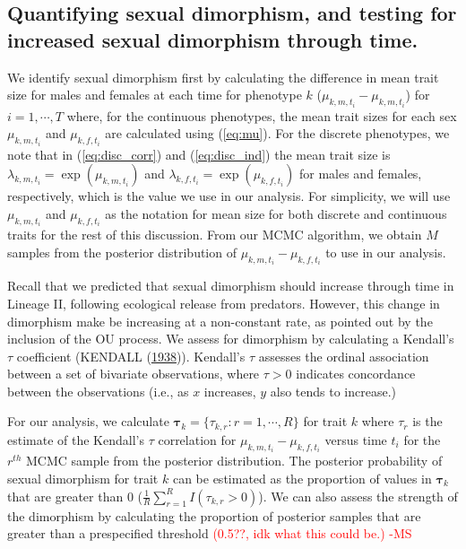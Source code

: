 \documentclass[
  12pt,
]{article}
\begin{document}
\hypertarget{quantifying-sexual-dimorphism-and-testing-for-increased-sexual-dimorphism-through-time.}{%
\subsection{Quantifying sexual dimorphism, and testing for increased
sexual dimorphism through
time.}\label{quantifying-sexual-dimorphism-and-testing-for-increased-sexual-dimorphism-through-time.}}

We identify sexual dimorphism first by calculating the difference in
mean trait size for males and females at each time for phenotype \(k\)
(\(\mu_{k,m,t_i} - \mu_{k,m,t_i}\)) for \(i = 1,\cdots,T\) where, for
the continuous phenotypes, the mean trait sizes for each sex
\(\mu_{k,m,t_i}\) and \(\mu_{k,f,t_i}\) are calculated using
(\ref{eq:mu}). For the discrete phenotypes, we note that in
(\ref{eq:disc_corr}) and (\ref{eq:disc_ind}) the mean trait size is
\(\lambda_{k,m,t_i} = \exp(\mu_{k,m,t_i})\) and
\(\lambda_{k,f,t_i} = \exp(\mu_{k,f,t_i})\) for males and females,
respectively, which is the value we use in our analysis. For simplicity,
we will use \(\mu_{k,m,t_i}\) and \(\mu_{k,f,t_i}\) as the notation for
mean size for both discrete and continuous traits for the rest of this
discussion. From our MCMC algorithm, we obtain \(M\) samples from the
posterior distribution of \(\mu_{k,m,t_i} - \mu_{k,f,t_i}\) to use in
our analysis.

Recall that we predicted that sexual dimorphism should increase through
time in Lineage II, following ecological release from predators.
However, this change in dimorphism make be increasing at a non-constant
rate, as pointed out by the inclusion of the OU process. We assess for
dimorphism by calculating a Kendall's \(\tau\) coefficient (KENDALL
(\protect\hyperlink{ref-KendallsTau}{1938})). Kendall's \(\tau\)
assesses the ordinal association between a set of bivariate
observations, where \(\tau > 0\) indicates concordance between the
observations (i.e., as \(x\) increases, \(y\) also tends to increase.)

For our analysis, we calculate
\(\boldsymbol{\tau}_k = \{\tau_{k,r}: r = 1,\cdots,R\}\) for trait \(k\)
where \(\tau_r\) is the estimate of the Kendall's \(\tau\) correlation
for \(\mu_{k,m,t_i} - \mu_{k,f,t_i}\) versus time \(t_i\) for the
\(r^{th}\) MCMC sample from the posterior distribution. The posterior
probability of sexual dimorphism for trait \(k\) can be estimated as the
proportion of values in \(\boldsymbol{\tau}_k\) that are greater than 0
(\(\frac{1}{R} \sum_{r=1}^R I(\tau_{k,r} > 0)\)). We can also assess the
strength of the dimorphism by calculating the proportion of posterior
samples that are greater than a prespecified threshold
\textcolor{red}{(0.5??, idk what this could be.) -MS}
\end{document}

